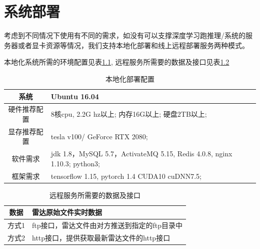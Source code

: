 \documentclass[10pt,english, openany]{book}
\begin{document}
\chapter{系统部署} \label{chapter: build}

考虑到不同情况下使用有不同的需求，如没有可以支撑深度学习跑推理/系统的服务器或者显卡资源等情况，我们支持本地化部署和线上远程部署服务两种模式。
    
本地化系统所需的环境配置见表\ref{tab6.2}, 远程服务所需要的数据及接口见表\ref{tab6.3}
\begin{table}[htbp]
\centering
\begin{tabular}{|c|l|}
	\hline
	系统 & Ubuntu 16.04\\
	\hline
	硬件推荐配置 & 8核cpu, 2.2G hz以上; 内存16G以上; 硬盘2TB以上; \\
	\hline
	显存推荐配置 & tesla v100/ GeForce RTX 2080; \\
	\hline
	软件需求 & jdk 1.8，MySQL 5.7，ActivateMQ 5.15, Redis 4.0.8, nginx 1.10.3; python3;\\
	\hline
	框架需求 & tensorflow 1.15, pytorch 1.4  CUDA10 cuDNN7.5;\\
	\hline
\end{tabular}
\caption{本地化部署配置}
\label{tab6.2}
\end{table}

\begin{table}[!htbp]
\centering
	\begin{tabular}{|c|l|}
	\hline
	数据 & 雷达原始文件实时数据 \\
	\hline
	方式1 & ftp接口，雷达文件由对方推送到指定的ftp目录中\\
	\hline
	方式2 & http接口，提供获取最新雷达文件的http接口 \\
	\hline
	\end{tabular}
\caption{远程服务所需要的数据及接口}
\label{tab6.3}
\end{table}
\end{document}
